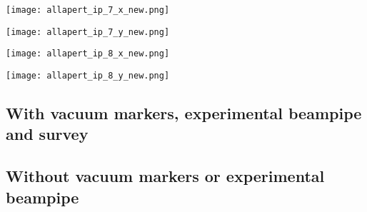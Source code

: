 \documentclass[11pt]{article}
\begin{document}
\begin{minipage}{0.47\linewidth}
\texttt{[image: allapert\_ip\_7\_x\_new.png]}
\end{minipage}
\begin{minipage}{0.47\linewidth}
\texttt{[image: allapert\_ip\_7\_y\_new.png]}
\end{minipage}

\begin{minipage}{0.47\linewidth}
\texttt{[image: allapert\_ip\_8\_x\_new.png]}
\end{minipage}
\begin{minipage}{0.47\linewidth}
\texttt{[image: allapert\_ip\_8\_y\_new.png]}
\end{minipage}


\subsection{With vacuum markers, experimental beampipe and survey}

\subsection{Without vacuum markers or experimental beampipe}


 
\end{document}
